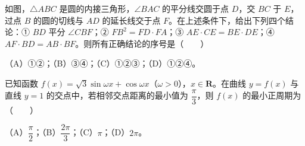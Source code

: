 \begin{question}
如图，$\triangle ABC$ 是圆的内接三角形，$\angle BAC$ 的平分线交圆于点 $D$，交 $BC$ 于 $E$，过点 $B$ 的圆的切线与 $AD$ 的延长线交于点 $F$。在上述条件下，给出下列四个结论：① $BD$ 平分 $\angle CBF$；② $FB^2=FD\cdot FA$；③ $AE\cdot CE=BE\cdot DE$；④ $AF\cdot BD=AB\cdot BF$。则所有正确结论的序号是\mbox{（　　）}
\nopagebreak[4]
\begin{center}\end{center}
\nopagebreak[4]
（A）①②；（B）③④；（C）①②③；（D）①②④。

\end{question}
\begin{question}
已知函数 $f(x)=\sqrt3\sin\omega x+\cos\omega x$（$\omega>0$），$x\in\mathbf R$。在曲线 $y=f(x)$ 与直线 $y=1$ 的交点中，若相邻交点距离的最小值为 $\dfrac\pi3$，则 $f(x)$ 的最小正周期为\mbox{（　　）}

（A）$\dfrac\pi2$；（B）$\dfrac{2\pi}{3}$；（C）$\pi$；（D）$2\pi$。

\end{question}

